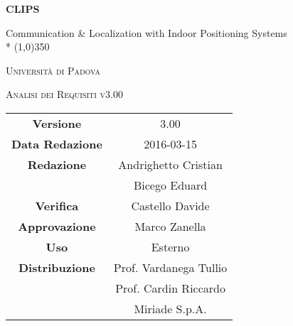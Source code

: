 \documentclass[a4paper,12pt]{article}
\author{Oscar Elia Conti, Marco Zanella}
\date{9/12/2015}
\begin{document}
	\begin{titlepage}
		\centering
		{\huge\bfseries CLIPS\par}
	Communication \& Localization with Indoor Positioning Systems \\*
	\line(1,0){350} \\
	{\scshape\LARGE Università di Padova \par}
	\vspace{1cm}
	{\scshape\Large Analisi dei Requisiti v3.00\par}
	\logo
	\newpage
		\begin{tabular}{c|c}
			{\hfill \textbf{Versione}} 			& 3.00			\\
			{\hfill\textbf{Data Redazione}} 		& 2016-03-15  		\\
			{\hfill\textbf{Redazione}}
										& Andrighetto Cristian \\
										& Bicego Eduard \\
			{\hfill\textbf{Verifica}} 				& Castello Davide \\
			{\hfill\textbf{Approvazione}} 		& Marco Zanella \\
			{\hfill\textbf{Uso}} 					& Esterno			\\
			{\hfill\textbf{Distribuzione}} 			& Prof. Vardanega Tullio \\
											& Prof. Cardin Riccardo \\
											& Miriade S.p.A. \\
		\end{tabular}
	\end{titlepage}
	\newpage
		\pagestyle{myfront}
		

	\newpage
		\tableofcontents
	\newpage
		\listoftables
	\newpage
		\listoffigures
	\label{LastFrontPage}

	\newpage
	\pagestyle{mymain}
		
	\newpage
		
	\newpage
		
	\newpage
		
	\label{LastPage}
\end{document}

